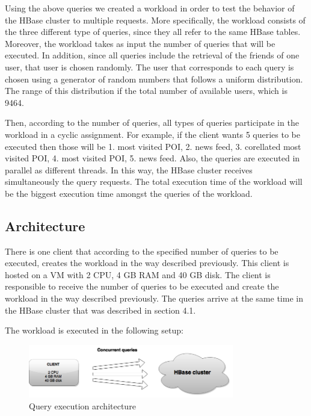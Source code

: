 Using the above queries we created a workload in order to test the behavior of the HBase cluster to multiple requests. More specifically, the workload 
consists of the three different type of queries, since they all refer to the same HBase tables. Moreover, the workload takes as input the number of queries 
that will be executed. In addition, since all queries include the retrieval of the friends of one user, that user is chosen randomly. The user that 
corresponds to each query is chosen using a generator of random numbers that follows a uniform distribution. 
The range of this distribution if the total number of available users, which is 9464.

Then, according to the number of queries, all types of queries participate in the workload in a cyclic assignment. 
For example, if the client wants 5 queries to be executed then those will be 1. most visited POI, 2. news feed, 3. corellated most visited POI, 
4. most visited POI, 5. news feed. Also, the queries are executed in parallel as different threads. In this way, the HBase cluster 
receives simultaneously the query requests. The total execution time of the 
workload will be the biggest execution time amongst the queries of the workload. 

\subsection{Architecture}

There is one client that according to the specified number of queries to be executed, creates the workload in the way described previously. This client is hosted 
on a VM with 2 CPU, 4 GB RAM and 40 GB disk. The client is responsible to receive the number of queries to be executed and create the workload in the way 
described previously. The queries arrive at the same time in the HBase cluster that was described in section 4.1.

The workload is executed in the following setup:

\begin{figure}[H]
  \centering
  \includegraphics[width=0.8\textwidth]{figures/query_ex_gray.png}
  \caption{Query execution architecture}
\end{figure}

